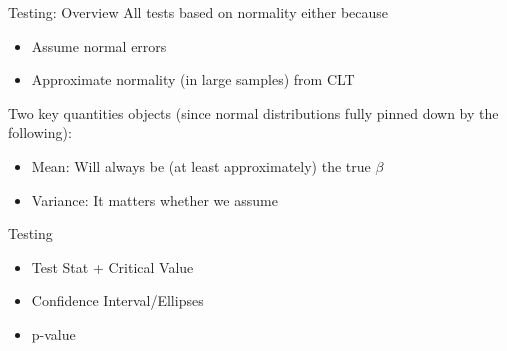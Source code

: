\documentclass[aspectratio=169, handout]{beamer}
\begin{document}
{\scriptsize
\begin{frame}{Testing: Overview}
All tests based on \alert{normality} either because
\vspace{-5pt}
\begin{itemize}
  \item \alert{Assume} normal errors
  \item \alert{Approximate} normality (in large samples) from
    \alert{CLT}
\end{itemize}
Two key quantities objects (since normal distributions fully pinned down
by the following):
\vspace{-5pt}
\begin{itemize}
  \item \alert{Mean}:
    Will always be (at least approximately) the true $\beta$
  \item \alert{Variance}:
    It matters whether we assume
\end{itemize}
Testing
\vspace{-5pt}
\begin{itemize}
  \item \alert{Test Stat + Critical Value}
  \item \alert{Confidence Interval/Ellipses}
  \item \alert{p-value}
\end{itemize}
\end{frame}
}
\end{document}
